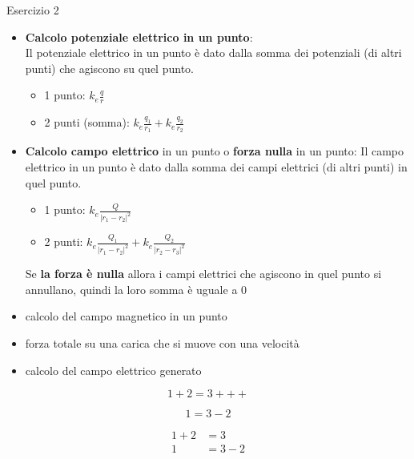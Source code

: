 \documentclass{article}
\begin{document}
Esercizio 2
\begin{itemize}
\item \textbf{Calcolo potenziale elettrico in un punto}:
    \\Il potenziale elettrico in un punto è dato dalla somma dei potenziali (di altri punti) che agiscono su quel punto.
    \begin{itemize}
        \item 1 punto: $k_e\frac{q}{r}$
        \item 2 punti (somma): $k_e\frac{q_1}{r_1}+k_e\frac{q_2}{r_2}$
    \end{itemize}

\item \textbf{Calcolo campo elettrico} in un punto o \textbf{forza nulla} in un punto:
    Il campo elettrico in un punto è dato dalla somma dei campi elettrici (di altri punti) in quel punto.
    \begin{itemize}
        \item 1 punto: $k_e\frac{Q}{|r_1-r_2|^2}$
        \item 2 punti: $k_e\frac{Q_1}{|r_1-r_2|^2}+k_e\frac{Q_2}{|r_2-r_3|^2}$
    \end{itemize}
  
    Se \textbf{la forza è nulla} allora i campi elettrici che agiscono in quel punto si annullano, quindi la loro somma è uguale a $0$
\item calcolo del campo magnetico in un punto
\item forza totale su una carica che si muove con una velocità
\item calcolo del campo elettrico generato 

\end{itemize}

\begin{equation*}
  1 + 2 = 3 +++
\end{equation*}

\begin{equation*}
  1 = 3 - 2
\end{equation*}

\begin{align*}
  1 + 2 &= 3\\
  1 &= 3 - 2
\end{align*}
\end{document}
